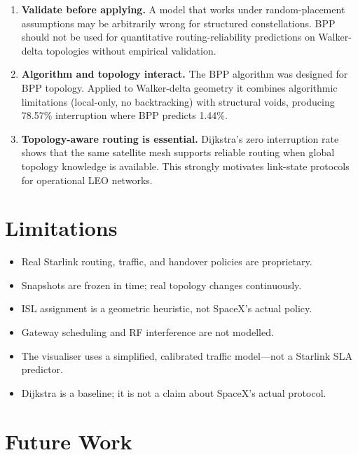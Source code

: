 \documentclass[12pt,a4paper]{report}
\begin{document}
\begin{enumerate}
  \item \textbf{Validate before applying.} A model that works under random-placement
        assumptions may be arbitrarily wrong for structured constellations. BPP should
        not be used for quantitative routing-reliability predictions on Walker-delta
        topologies without empirical validation.

  \item \textbf{Algorithm and topology interact.} The BPP algorithm was designed for
        BPP topology. Applied to Walker-delta geometry it combines algorithmic
        limitations (local-only, no backtracking) with structural voids, producing
        78.57\% interruption where BPP predicts 1.44\%.

  \item \textbf{Topology-aware routing is essential.} Dijkstra's zero interruption
        rate shows that the same satellite mesh supports reliable routing when global
        topology knowledge is available. This strongly motivates link-state protocols
        for operational LEO networks.
\end{enumerate}

\section{Limitations}

\begin{itemize}[noitemsep]
  \item Real Starlink routing, traffic, and handover policies are proprietary.
  \item Snapshots are frozen in time; real topology changes continuously.
  \item ISL assignment is a geometric heuristic, not SpaceX's actual policy.
  \item Gateway scheduling and RF interference are not modelled.
  \item The visualiser uses a simplified, calibrated traffic model---not a Starlink SLA predictor.
  \item Dijkstra is a baseline; it is not a claim about SpaceX's actual protocol.
\end{itemize}

\section{Future Work}
\end{document}
